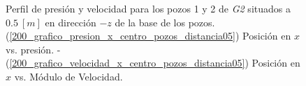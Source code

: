 \documentclass[10pt,a4paper,final]{article}
\begin{document}
\begin{figure}[H]
   \centering
   \hspace{0.1\linewidth}
    \caption{Perfil de presión y velocidad para los pozos 1 y 2 de \emph{G2} situados a $0.5~[m]$ en dirección $-z$ de la base de los pozos. (\ref{200_grafico_presion_x_centro_pozos_distancia05}) Posición en $x$ vs. presión. - (\ref{200_grafico_velocidad_x_centro_pozos_distancia05}) Posición en $x$ vs. Módulo de Velocidad.}
   \label{200_grafico_velocidad_presion_centro_pozos_distancia05}                %
\end{figure}
\end{document}
